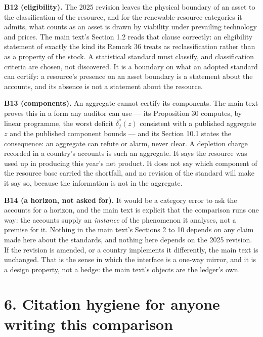\documentclass[11pt]{article}
\begin{document}
\textbf{B12 (eligibility).} The 2025 revision leaves the physical boundary of an asset to the classification of the resource, and for the renewable-resource categories it admits, what counts as an asset is drawn by viability under prevailing technology and prices. The main text's Section 1.2 reads that clause correctly: an eligibility statement of exactly the kind its Remark 36 treats as reclassification rather than as a property of the stock. A statistical standard must classify, and classification criteria are chosen, not discovered. It is a boundary on what an adopted standard can certify: a resource's presence on an asset boundary is a statement about the accounts, and its absence is not a statement about the resource.

\textbf{B13 (components).} An aggregate cannot certify its components. The main text proves this in a form any auditor can use --- its Proposition 30 computes, by linear programme, the worst deficit \(\delta_j^{\ast}(z)\) consistent with a published aggregate \(z\) and the published component bounds --- and its Section 10.1 states the consequence: an aggregate can refute or alarm, never clear. A depletion charge recorded in a country's accounts is such an aggregate. It says the resource was used up in producing this year's net product. It does not say which component of the resource base carried the shortfall, and no revision of the standard will make it say so, because the information is not in the aggregate.

\textbf{B14 (a horizon, not asked for).} It would be a category error to ask the accounts for a horizon, and the main text is explicit that the comparison runs one way: the accounts supply an \emph{instance} of the phenomenon it analyses, not a premise for it. Nothing in the main text's Sections 2 to 10 depends on any claim made here about the standards, and nothing here depends on the 2025 revision. If the revision is amended, or a country implements it differently, the main text is unchanged. That is the sense in which the interface is a one-way mirror, and it is a design property, not a hedge: the main text's objects are the ledger's own.

\vspace{0.8em}

\section*{6. Citation hygiene for anyone writing this comparison}\label{6-citation-hygiene-for-anyone-writing-this-comparison}
\end{document}
